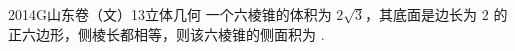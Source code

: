
\begin{problem}{2014}{G}{山东卷（文）}{13}{立体几何}
一个六棱锥的体积为 $ 2\sqrt{3} $，其底面是边长为 $ 2 $ 的正六边形，侧棱长都相等，则该六棱锥的侧面积为 \underline{\hspace{4em}}.
\end{problem}

\begin{answer}

\end{answer}

\begin{solutions}

\end{solutions}